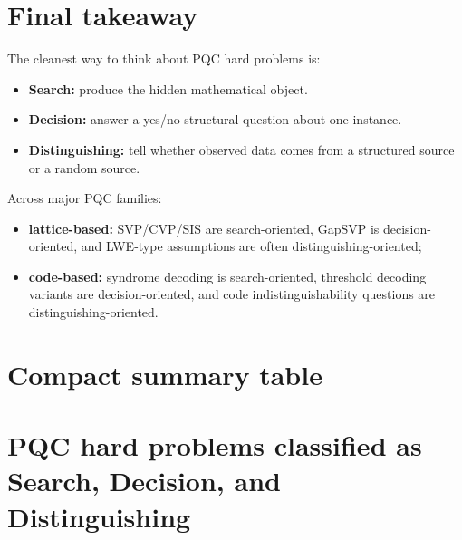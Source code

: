 \documentclass[11pt]{article}
\begin{document}
	\newpage
	\section{Final takeaway}
	
	The cleanest way to think about PQC hard problems is:
	
	\begin{itemize}
		\item \textbf{Search:} produce the hidden mathematical object.
		\item \textbf{Decision:} answer a yes/no structural question about one instance.
		\item \textbf{Distinguishing:} tell whether observed data comes from a structured source or a random source.
	\end{itemize}
	
	\noindent
	Across major PQC families:
	\begin{itemize}
		\item \textbf{lattice-based:} SVP/CVP/SIS are search-oriented, GapSVP is decision-oriented, and LWE-type assumptions are often distinguishing-oriented;
		\item \textbf{code-based:} syndrome decoding is search-oriented, threshold decoding variants are decision-oriented, and code indistinguishability questions are distinguishing-oriented.
	\end{itemize}

	\newpage
	\section{Compact summary table}
	
	\section{PQC hard problems classified as Search, Decision, and Distinguishing}
	
\end{document}
